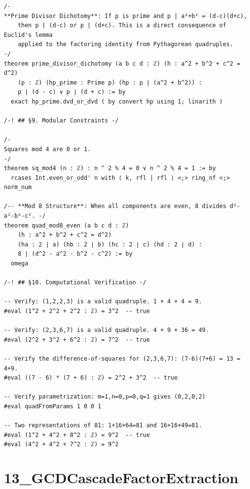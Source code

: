 \documentclass[11pt,openany]{book}
\theoremstyle{definition}
\theoremstyle{plain}
\theoremstyle{remark}
\begin{document}
\begin{lstlisting}[style=lean]
/-
**Prime Divisor Dichotomy**: If p is prime and p | a²+b² = (d-c)(d+c),
    then p | (d-c) or p | (d+c). This is a direct consequence of Euclid's lemma
    applied to the factoring identity from Pythagorean quadruples.
-/
theorem prime_divisor_dichotomy (a b c d : ℤ) (h : a^2 + b^2 + c^2 = d^2)
    (p : ℤ) (hp_prime : Prime p) (hp : p ∣ (a^2 + b^2)) :
    p ∣ (d - c) ∨ p ∣ (d + c) := by
  exact hp_prime.dvd_or_dvd ( by convert hp using 1; linarith )

/-! ## §9. Modular Constraints -/

/-
Squares mod 4 are 0 or 1.
-/
theorem sq_mod4 (n : ℤ) : n ^ 2 % 4 = 0 ∨ n ^ 2 % 4 = 1 := by
  rcases Int.even_or_odd' n with ⟨ k, rfl | rfl ⟩ <;> ring_nf <;> norm_num

/-- **Mod 8 Structure**: When all components are even, 8 divides d²-a²-b²-c². -/
theorem quad_mod8_even (a b c d : ℤ)
    (h : a^2 + b^2 + c^2 = d^2)
    (ha : 2 ∣ a) (hb : 2 ∣ b) (hc : 2 ∣ c) (hd : 2 ∣ d) :
    8 ∣ (d^2 - a^2 - b^2 - c^2) := by
  omega

/-! ## §10. Computational Verification -/

-- Verify: (1,2,2,3) is a valid quadruple. 1 + 4 + 4 = 9.
#eval (1^2 + 2^2 + 2^2 : ℤ) = 3^2  -- true

-- Verify: (2,3,6,7) is a valid quadruple. 4 + 9 + 36 = 49.
#eval (2^2 + 3^2 + 6^2 : ℤ) = 7^2  -- true

-- Verify the difference-of-squares for (2,3,6,7): (7-6)(7+6) = 13 = 4+9.
#eval ((7 - 6) * (7 + 6) : ℤ) = 2^2 + 3^2  -- true

-- Verify parametrization: m=1,n=0,p=0,q=1 gives (0,2,0,2)
#eval quadFromParams 1 0 0 1

-- Two representations of 81: 1+16+64=81 and 16+16+49=81.
#eval (1^2 + 4^2 + 8^2 : ℤ) = 9^2  -- true
#eval (4^2 + 4^2 + 7^2 : ℤ) = 9^2
\end{lstlisting}

\clearpage

\section*{13\_GCDCascadeFactorExtraction}
\end{document}
